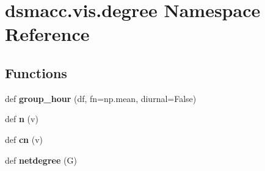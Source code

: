 \hypertarget{namespacedsmacc_1_1vis_1_1degree}{}\section{dsmacc.\+vis.\+degree Namespace Reference}
\label{namespacedsmacc_1_1vis_1_1degree}
\subsection*{Functions}
\begin{DoxyCompactItemize}
\item 
\mbox{\label{namespacedsmacc_1_1vis_1_1degree_a9467accddb339c312c4cef4559e068f6}} 
def {\bfseries group\+\_\+hour} (df, fn=np.\+mean, diurnal=False)
\item 
\mbox{\label{namespacedsmacc_1_1vis_1_1degree_a3973e91404b84cbc301f2c5d5654d0a3}} 
def {\bfseries n} (v)
\item 
\mbox{\label{namespacedsmacc_1_1vis_1_1degree_a0f2124a28766d4a1966de9cd4d6a4ec7}} 
def {\bfseries cn} (v)
\item 
\mbox{\label{namespacedsmacc_1_1vis_1_1degree_a1a683ab20f670b8fd99a10362e97a513}} 
def {\bfseries netdegree} (G)
\end{DoxyCompactItemize}
